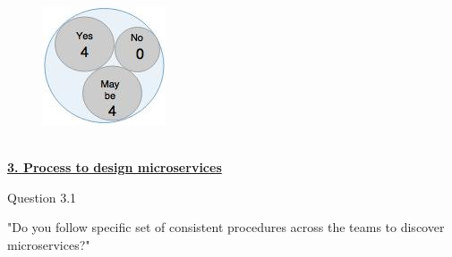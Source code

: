 \begin{figure}[H]
\begin{center}
\includegraphics[scale=0.5]{figures/question2_3}
\label{fig:hybris_architecture/interview/question2-3}
\end{center}
\end{figure}
\\
\textbf{\underline{3. Process to design microservices}}\\
\begin{shaded} Question 3.1 \end{shaded} \label{question:hybris_architecture/interview/question_3.1}
"Do you follow specific set of consistent procedures across the teams to discover microservices?"

